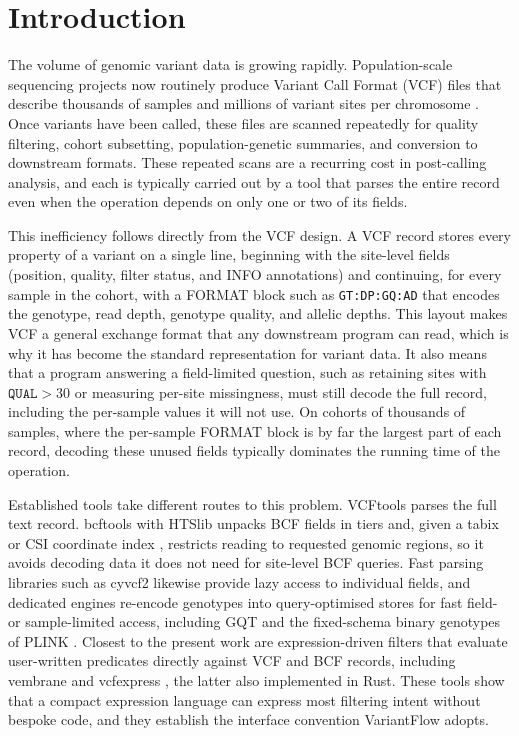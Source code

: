 \section{Introduction}

The volume of genomic variant data is growing rapidly. Population-scale
sequencing projects now routinely produce Variant Call Format (VCF) files that
describe thousands of samples and millions of variant sites per chromosome
\citep{vcftools}. Once variants have been called, these files are scanned
repeatedly for quality filtering, cohort subsetting, population-genetic
summaries, and conversion to downstream formats. These repeated scans are a
recurring cost in post-calling analysis, and each is typically carried out by a
tool that parses the entire record even when the operation depends on only one or
two of its fields.

This inefficiency follows directly from the VCF design. A VCF record stores
every property of a variant on a single line, beginning with the site-level
fields (position, quality, filter status, and INFO annotations) and continuing,
for every sample in the cohort, with a FORMAT block such as
\texttt{GT:DP:GQ:AD} that encodes the genotype, read depth, genotype quality,
and allelic depths. This layout makes VCF a general exchange format that any
downstream program can read, which is why it has become the standard
representation for variant data. It also means that a program answering a
field-limited question, such as retaining sites with $\mathtt{QUAL}>30$ or
measuring per-site missingness, must still decode the full record, including the
per-sample values it will not use. On cohorts of thousands of samples, where the
per-sample FORMAT block is by far the largest part of each record, decoding these
unused fields typically dominates the running time of the operation.

Established tools take different routes to this problem. VCFtools
\citep{vcftools} parses the full text record. bcftools with HTSlib
\citep{bcftools,htslib} unpacks BCF fields in tiers and, given a tabix or CSI
coordinate index \citep{tabix}, restricts reading to requested genomic regions,
so it avoids decoding data it does not need for site-level BCF queries. Fast
parsing libraries such as cyvcf2 \citep{cyvcf2} likewise provide lazy access to
individual fields, and dedicated engines re-encode genotypes into
query-optimised stores for fast field- or sample-limited access, including GQT
\citep{gqt} and the fixed-schema binary genotypes of PLINK \citep{plink2}.
Closest to the present work are expression-driven filters that evaluate
user-written predicates directly against VCF and BCF records, including vembrane
\citep{vembrane} and vcfexpress \citep{vcfexpress}, the latter also implemented
in Rust. These tools show that a compact expression language can express most
filtering intent without bespoke code, and they establish the interface
convention VariantFlow adopts.

